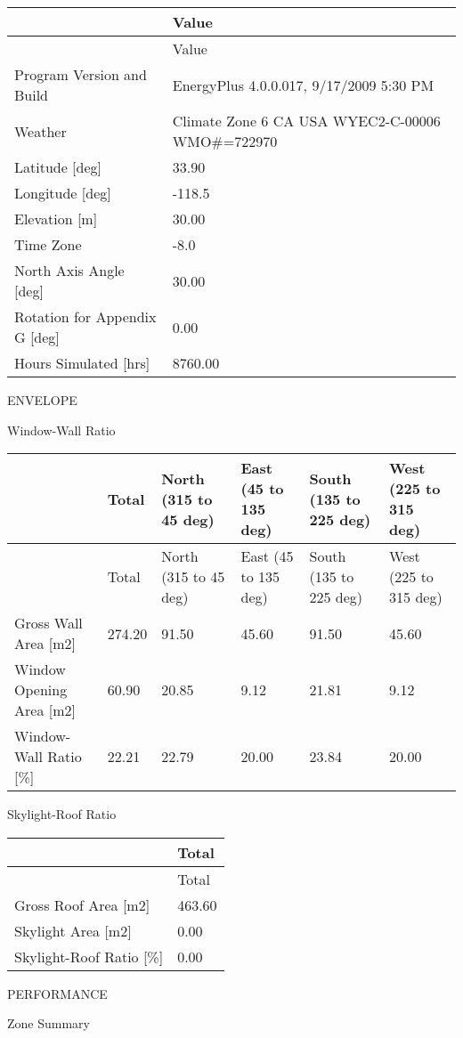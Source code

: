 \begin{longtable}[c]{>{\raggedright}p{2.25in}>{\raggedright}p{3.74in}}
\toprule 
~ & Value \tabularnewline
\midrule
\endfirsthead

\toprule 
~ & Value \tabularnewline
\midrule
\endhead

Program Version and Build & EnergyPlus 4.0.0.017, 9/17/2009 5:30 PM \tabularnewline
Weather & Climate Zone 6 CA USA WYEC2-C-00006 WMO\#=722970 \tabularnewline
Latitude [deg] & 33.90 \tabularnewline
Longitude [deg] & -118.5 \tabularnewline
Elevation [m] & 30.00 \tabularnewline
Time Zone & -8.0 \tabularnewline
North Axis Angle [deg] & 30.00 \tabularnewline
Rotation for Appendix G [deg] & 0.00 \tabularnewline
Hours Simulated [hrs] & 8760.00 \tabularnewline
\bottomrule
\end{longtable}

ENVELOPE

Window-Wall Ratio

\begin{longtable}[c]{>{\raggedright}p{1.0in}>{\raggedright}p{1.0in}>{\raggedright}p{1.0in}>{\raggedright}p{1.0in}>{\raggedright}p{1.0in}>{\raggedright}p{1.0in}}
\toprule 
~ & Total & North (315 to 45 deg) & East (45 to 135 deg) & South (135 to 225 deg) & West (225 to 315 deg) \tabularnewline
\midrule
\endfirsthead

\toprule 
~ & Total & North (315 to 45 deg) & East (45 to 135 deg) & South (135 to 225 deg) & West (225 to 315 deg) \tabularnewline
\midrule
\endhead

Gross Wall Area [m2] & 274.20 & 91.50 & 45.60 & 91.50 & 45.60 \tabularnewline
Window Opening Area [m2] & 60.90 & 20.85 & 9.12 & 21.81 & 9.12 \tabularnewline
Window-Wall Ratio [\%] & 22.21 & 22.79 & 20.00 & 23.84 & 20.00 \tabularnewline
\bottomrule
\end{longtable}

Skylight-Roof Ratio

\begin{longtable}[c]{@{}ll@{}}
\toprule 
~ & Total \tabularnewline
\midrule
\endfirsthead

\toprule 
~ & Total \tabularnewline
\midrule
\endhead

Gross Roof Area [m2] & 463.60 \tabularnewline
Skylight Area [m2] & 0.00 \tabularnewline
Skylight-Roof Ratio [\%] & 0.00 \tabularnewline
\bottomrule
\end{longtable}

PERFORMANCE

Zone Summary

